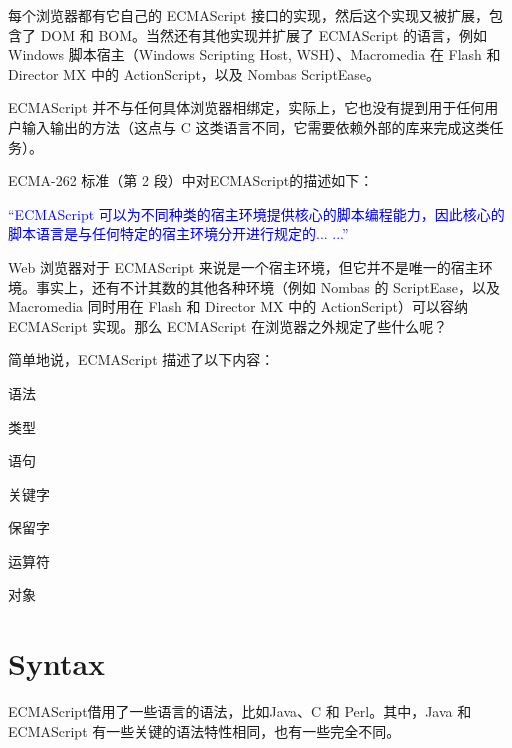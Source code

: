 每个浏览器都有它自己的 ECMAScript 接口的实现，然后这个实现又被扩展，包含了 DOM 和 BOM。当然还有其他实现并扩展了 ECMAScript 的语言，例如 Windows 脚本宿主（Windows Scripting Host, WSH）、Macromedia 在 Flash 和 Director MX 中的 ActionScript，以及 Nombas ScriptEase。

ECMAScript 并不与任何具体浏览器相绑定，实际上，它也没有提到用于任何用户输入输出的方法（这点与 C 这类语言不同，它需要依赖外部的库来完成这类任务）。

ECMA-262 标准（第 2 段）中对ECMAScript的描述如下：

\vspace{20pt}

\textcolor{Blue}{“ECMAScript 可以为不同种类的宿主环境提供核心的脚本编程能力，因此核心的脚本语言是与任何特定的宿主环境分开进行规定的... ...”}

\vspace{20pt}



Web 浏览器对于 ECMAScript 来说是一个宿主环境，但它并不是唯一的宿主环境。事实上，还有不计其数的其他各种环境（例如 Nombas 的 ScriptEase，以及 Macromedia 同时用在 Flash 和 Director MX 中的 ActionScript）可以容纳 ECMAScript 实现。那么 ECMAScript 在浏览器之外规定了些什么呢？

简单地说，ECMAScript 描述了以下内容：

\begin{compactitem}
\item 语法
\item 类型
\item 语句
\item 关键字
\item 保留字
\item 运算符
\item 对象
\end{compactitem}





\chapter{Syntax}

ECMAScript借用了一些语言的语法，比如Java、C 和 Perl。其中，Java 和 ECMAScript 有一些关键的语法特性相同，也有一些完全不同。

